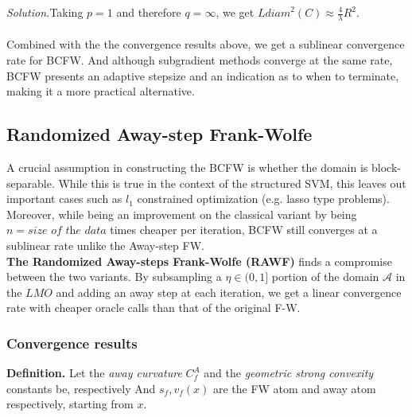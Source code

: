 \textit{Solution.}\quad Taking $p=1$ and therefore $q=\infty$, we get $L\textit{diam}^{2}(C)\approx \frac{4}{\lambda}R^{2}$.\\
\\
Combined with the the convergence results above, we get a sublinear convergence
rate for BCFW. And although subgradient methods converge at the same rate, BCFW
presents an adaptive stepsize and an indication as to when to terminate, making
it a more practical alternative.
\subsection{Randomized Away-step Frank-Wolfe}
A crucial assumption in constructing the BCFW is whether the domain is
block-separable. While this is true in the context of the structured SVM, this
leaves out important cases such as $l_{1}$ constrained optimization (e.g. lasso
type problems). \\
Moreover, while being an improvement on the classical variant by being
$n=\textit{size of the data}$ times cheaper per iteration, BCFW still converges
at a sublinear rate unlike the Away-step FW.\\

\textbf{The Randomized Away-steps Frank-Wolfe (RAWF)} finds a compromise between
the two variants. By subsampling a $\eta\in(0,1]$ portion of the domain
$\mathcal{A}$ in the $LMO$ and adding an away step at each iteration, we get a
linear convergence rate with cheaper oracle calls than that of the original F-W.
\subsubsection{Convergence results}
\textbf{Definition.}
Let the \textit{away curvature} $C^{A}_{f}$ and the \textit{geometric strong convexity} constants be, respectively
And $s_{f}, v_{f}(x)$ are the FW atom and away atom respectively, starting from $x$.\\

